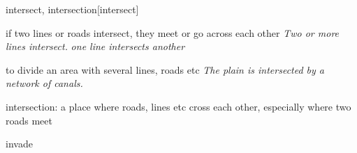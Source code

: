 \begin{word}{intersect, intersection}[intersect]
    
    if two lines or roads intersect, they meet or go across each other
    \textit{Two or more lines intersect.}
    \textit{one line intersects another}

    to divide an area with several lines, roads etc
    \textit{The plain is intersected by a network of canals.}

    intersection: a place where roads, lines etc cross each other, especially where two roads meet
\end{word}

\begin{word}{invade}
\end{word}

